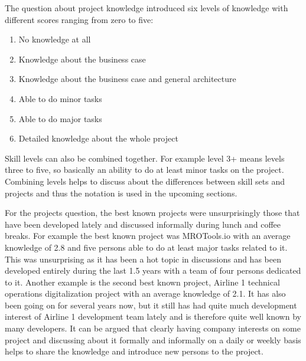 The question about project knowledge introduced six levels of knowledge with different scores ranging from zero to five:

\begin{enumerate}
	\itemsep0em %
	\setcounter{enumi}{-1}
	\item \begin{center} No knowledge at all \end{center}
	\item \begin{center} Knowledge about the business case \end{center}
	\item \begin{center} Knowledge about the business case and general architecture \end{center}
	\item \begin{center} Able to do minor tasks \end{center}
	\item \begin{center} Able to do major tasks \end{center}
	\item \begin{center} Detailed knowledge about the whole project \end{center}
\end{enumerate}

Skill levels can also be combined together. For example level 3+ means levels three to five, so basically an ability to do at least minor tasks on the project.
Combining levels helps to discuss about the differences between skill sets and projects and thus the notation is used in the upcoming sections.

For the projects question, the best known projects were unsurprisingly those that have been developed lately and discussed informally during lunch and coffee breaks. For example
the best known project was MROTools.io with an average knowledge of 2.8 and five persons able to do at least major tasks related to it. This was unsurprising as it has been
a hot topic in discussions and has been developed entirely during the last 1.5 years with a team of four persons dedicated to it. Another example is the second best known project,
Airline 1 technical operations digitalization project with an average knowledge of 2.1. It has also been going on for several years now, but it still
has had quite much development interest of Airline 1 development
team lately and is therefore quite well known by many developers. It can be argued that clearly having company interests on some project and discussing about it formally and informally
on a daily or weekly basis helps to share the knowledge and introduce new persons to the project.


